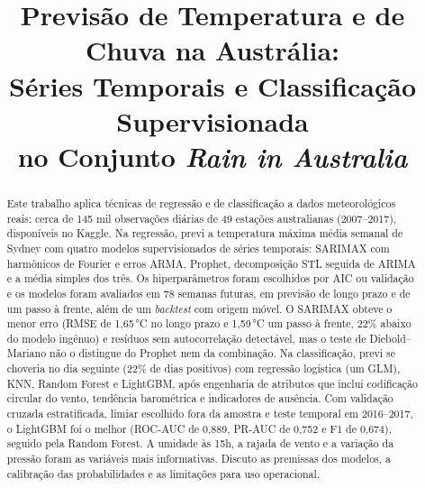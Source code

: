 \documentclass[conference,a4paper]{IEEEtran}
\begin{document}
\title{Previsão de Temperatura e de Chuva na Austrália:\\
Séries Temporais e Classificação Supervisionada\\ no Conjunto \textit{Rain in Australia}}

\author{
}

\maketitle

\begin{abstract}
Este trabalho aplica técnicas de regressão e de classificação a dados
meteorológicos reais: cerca de 145 mil observações diárias de 49 estações australianas
(2007--2017), disponíveis no Kaggle. Na regressão, previ a temperatura máxima média semanal
de Sydney com quatro modelos supervisionados de séries temporais: SARIMAX com harmônicos de
Fourier e erros ARMA, Prophet, decomposição STL seguida de ARIMA e a média simples dos três.
Os hiperparâmetros foram escolhidos por AIC ou validação e os modelos foram avaliados em
78 semanas futuras, em previsão de longo prazo e de um passo à frente, além de um
\textit{backtest} com origem móvel. O SARIMAX obteve o menor erro (RMSE de 1,65\,°C no longo
prazo e 1,59\,°C um passo à frente, 22\% abaixo do modelo ingênuo) e resíduos sem autocorrelação
detectável, mas o teste de Diebold--Mariano não o distingue do Prophet nem da combinação.
Na classificação, previ se choveria no dia seguinte (22\% de dias positivos) com regressão
logística (um GLM), KNN, Random Forest e LightGBM, após engenharia de atributos que inclui
codificação circular do vento, tendência barométrica e indicadores de ausência. Com validação
cruzada estratificada, limiar escolhido fora da amostra e teste temporal em 2016--2017, o
LightGBM foi o melhor (ROC-AUC de 0,889, PR-AUC de 0,752 e F1 de 0,674), seguido pela Random
Forest. A umidade às 15h, a rajada de vento e a variação da pressão foram as variáveis mais
informativas. Discuto as premissas dos modelos, a calibração das probabilidades e as
limitações para uso operacional.
\end{abstract}
\end{document}
